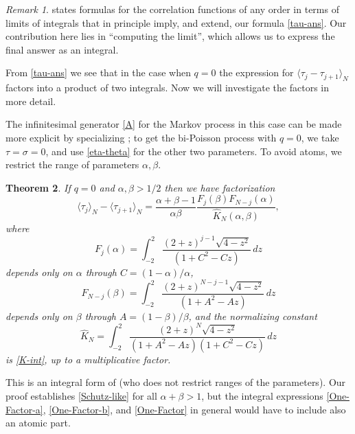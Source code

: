 \documentclass{amsart}
\newtheorem{theorem}{Theorem}[section]
\theoremstyle{definition}
\theoremstyle{remark}
\newtheorem{remark}[theorem]{Remark}
\theoremstyle{remark}
\theoremstyle{definition}
\numberwithin{equation}{section}
\begin{document}
\begin{remark}
  \cite[Section 7.1]{uchiyama2004asymmetric} states formulas for the correlation functions of any order in terms of limits of integrals that in principle imply, and extend, our formula \eqref{tau-ans}.
  Our contribution here lies in ``computing the limit'',  which allows us to express  the final answer  as an integral.
\end{remark}

From \eqref{tau-ans} we see that in the case when $q=0$ the expression for $\langle\tau_j-\tau_{j+1}\rangle_N$ factors into a product of two integrals.
Now we will investigate the factors in more
detail.

The infinitesimal generator \eqref{A} for the Markov process in this case can be made
 more explicit by specializing  \cite{Bryc-Wesolowski-2013-evo}; to get the bi-Poisson process with $q=0$,
we take  $\tau=\sigma=0$, and use \eqref{eta-theta} for the other two parameters.
To avoid  atoms, we  restrict the range of  parameters $\alpha,\beta$.

 \begin{theorem}\label{Thm-tau:q=0}
   If $q=0$ and $\alpha,\beta>1/2$ then we have  factorization {}
    \begin{equation}\label{Schutz-like}
      \langle \tau_j\rangle_N-\langle \tau_{j+1}\rangle_N
 =
      \frac{\alpha+\beta-1}{\alpha\beta} \frac{F_{j}(\beta)F_{N-j}(\alpha)}{\hat K_N(\alpha,\beta)},
    \end{equation}
    where
    \begin{equation}
      \label{One-Factor-a}
      F_j(\alpha)=  \int_{-2}^2 \frac{(2+z)^{j-1} \sqrt{4-z^2}}{  (1+C^2-Cz) }\,  dz
    \end{equation}
    depends only on $\alpha$ through $C=(1-\alpha)/\alpha$,
      \begin{equation}
      \label{One-Factor-b}
      F_{N-j}(\beta)=  \int_{-2}^2 \frac{(2+z)^{N-j-1} \sqrt{4-z^2}}{(1+A^2-Az)  }\,  dz
    \end{equation}
    depends only on $\beta$ through $A=(1-\beta)/\beta$, and the normalizing constant
      \begin{equation}
      \label{One-Factor}
      \hat K_N=  \int_{-2}^2 \frac{(2+z)^N \sqrt{4-z^2}}{(1+A^2-Az) (1+C^2-Cz) }\,  dz
    \end{equation}
    is   \eqref{K-int}, up to  a multiplicative factor.
 \end{theorem}
 This is an integral form  of \cite[expression (3.3)]{schutz1993phase} (who does not restrict  ranges of the parameters). Our proof establishes \eqref{Schutz-like} for all $\alpha+\beta>1$,
  but the integral expressions \eqref{One-Factor-a}, \eqref{One-Factor-b}, and \eqref{One-Factor} in general would have to include also an atomic part.
\end{document}
